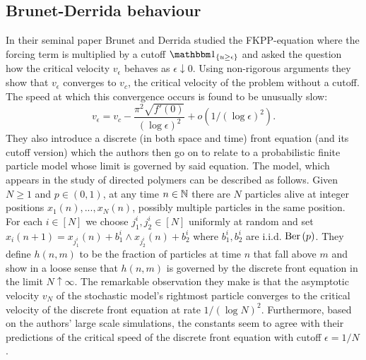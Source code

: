 \subsection{Brunet-Derrida behaviour}
In their seminal paper \cite{brunet1997shift} Brunet and Derrida studied the FKPP-equation where the forcing term is multiplied by a cutoff $\Ind_{\{ u \geq \epsilon\}}$ and asked the question how the critical velocity $v_\epsilon$ behaves as $\epsilon \downarrow 0$. Using non-rigorous arguments they show that $v_\epsilon$ converges to $v_c$, the critical velocity of the problem without a cutoff. The speed at which this convergence occurs is found to be unusually slow:
\begin{equation}\label{eqn:brun_der_prediction}
v_\epsilon = v_c - \frac{\pi^2 \sqrt{f'(0)}}{(\log \epsilon)^2} + o(1/(\log \epsilon)^2). 
\end{equation}
They also introduce a discrete (in both space and time) front equation (and its cutoff version) which the authors then go on to relate to a probabilistic finite particle model whose limit is governed by said equation. The model, which appears in the study of directed polymers can be described as follows. Given $N \geq 1$ and $p \in (0,1)$, at any time $n \in \mathbb{N}$ there are $N$ particles alive at integer positions $x_1(n), ..., x_N(n)$, possibly multiple particles in the same position. For each $i \in [N]$ we choose $j^i_1, j^i_2 \in [N]$ uniformly at random and set $x_i(n+1) = x_{j^i_1}(n) + b^i_1 \land x_{j^i_2}(n) + b^i_2$ where $b^i_1, b^i_2$ are i.i.d. $\text{Ber} \left( p \right)$. They define $h(n, m)$ to be the fraction of particles at time $n$ that fall above $m$ and show in a loose sense that $h(n,m)$ is governed by the discrete front equation in the limit $N \uparrow \infty$. The remarkable observation they make is that the asymptotic velocity $v_N$ of the stochastic model's rightmost particle converges to the critical velocity of the discrete front equation at rate $1/(\log N)^2$. Furthermore, based on the authors' large scale simulations, the constants seem to agree with their predictions of the critical speed of the discrete front equation with cutoff $\epsilon = 1/N$. \\

